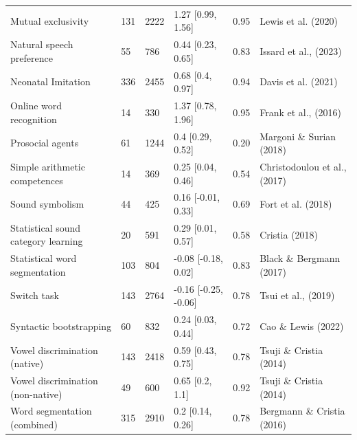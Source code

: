 \documentclass[
  man]{apa6}
\newenvironment{lltable}{\begin{landscape}\centering\begin{ThreePartTable}}{\end{ThreePartTable}\end{landscape}}
\begin{document}
\begin{lltable}
\begin{longtable}{llllll}
Mutual exclusivity & 131 & 2222 & 1.27 [0.99, 1.56] & 0.95 & Lewis et al. (2020)\\
Natural speech preference & 55 & 786 & 0.44 [0.23, 0.65] & 0.83 & Issard et al., (2023)\\
Neonatal Imitation & 336 & 2455 & 0.68 [0.4, 0.97] & 0.94 & Davis et al. (2021)\\
Online word recognition & 14 & 330 & 1.37 [0.78, 1.96] & 0.95 & Frank et al., (2016)\\
Prosocial agents & 61 & 1244 & 0.4 [0.29, 0.52] & 0.20 & Margoni \& Surian (2018)\\
Simple arithmetic competences & 14 & 369 & 0.25 [0.04, 0.46] & 0.54 & Christodoulou et al., (2017)\\
Sound symbolism & 44 & 425 & 0.16 [-0.01, 0.33] & 0.69 & Fort et al. (2018)\\
Statistical sound category learning & 20 & 591 & 0.29 [0.01, 0.57] & 0.58 & Cristia (2018)\\
Statistical word segmentation & 103 & 804 & -0.08 [-0.18, 0.02] & 0.83 & Black \& Bergmann (2017)\\
Switch task & 143 & 2764 & -0.16 [-0.25, -0.06] & 0.78 & Tsui et al., (2019)\\
Syntactic bootstrapping & 60 & 832 & 0.24 [0.03, 0.44] & 0.72 & Cao \& Lewis (2022)\\
Vowel discrimination (native) & 143 & 2418 & 0.59 [0.43, 0.75] & 0.78 & Tsuji \& Cristia (2014)\\
Vowel discrimination (non-native) & 49 & 600 & 0.65 [0.2, 1.1] & 0.92 & Tsuji \& Cristia (2014)\\
Word segmentation (combined) & 315 & 2910 & 0.2 [0.14, 0.26] & 0.78 & Bergmann \& Cristia (2016)\\
\bottomrule
\end{longtable}

\end{lltable}
\end{document}

